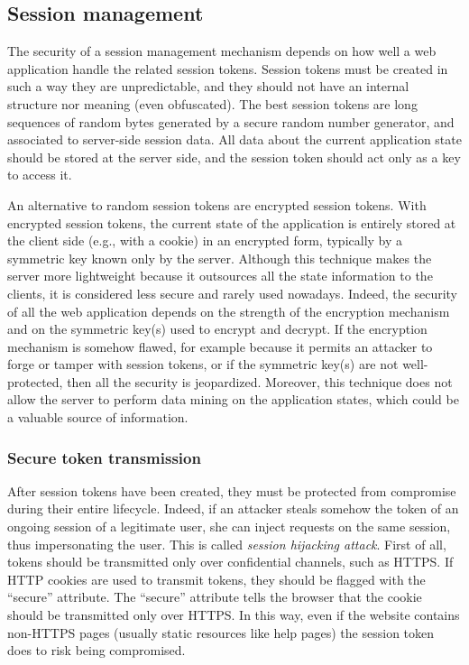 \documentclass[a4paper,12pt]{article}
\begin{document}
\subsection{Session management}
The security of a session management mechanism depends on how well a web application handle the related session tokens. Session tokens must be created in such a way they are unpredictable, and they should not have an internal structure nor meaning (even obfuscated). The best session tokens are long sequences of random bytes generated by a secure random number generator, and associated to server-side session data. All data about the current application state should be stored at the server side, and the session token should act only as a key to access it.

An alternative to random session tokens are encrypted session tokens. With encrypted session tokens, the current state of the application is entirely stored at the client side (e.g., with a cookie) in an encrypted form, typically by a symmetric key known only by the server. Although this technique makes the server more lightweight because it outsources all the state information to the clients, it is considered less secure and rarely used nowadays. Indeed, the security of all the web application depends on the strength of the encryption mechanism and on the symmetric key(s) used to encrypt and decrypt. If the encryption mechanism is somehow flawed, for example because it permits an attacker to forge or tamper with session tokens, or if the symmetric key(s) are not well-protected, then all the security is jeopardized. Moreover, this technique does not allow the server to perform data mining on the application states, which could be a valuable source of information.

\subsubsection{Secure token transmission}
After session tokens have been created, they must be protected from compromise during their entire lifecycle. Indeed, if an attacker steals somehow the token of an ongoing session of a legitimate user, she can inject requests on the same session, thus impersonating the user. This is called \textit{session hijacking attack}. First of all, tokens should be transmitted only over confidential channels, such as HTTPS. If HTTP cookies are used to transmit tokens, they should be flagged with the “secure” attribute. The “secure” attribute tells the browser that the cookie should be transmitted only over HTTPS. In this way, even if the website contains non-HTTPS pages (usually static resources like help pages) the session token does to risk being compromised.
\end{document}

